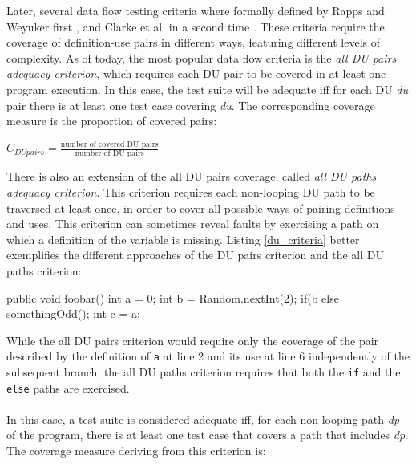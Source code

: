 Later, several data  flow testing criteria where formally defined by Rapps and Weyuker first \cite{Rapps}, and Clarke et al. in a second time \cite{Clarke}. These criteria require the coverage of definition-use pairs in different ways, featuring different levels of complexity.
As of today, the most popular data flow criteria is the \textit{all DU pairs adequacy criterion}, which 
requires each DU pair to be covered in at least one program execution. In this 
case, the test suite will be adequate iff for each DU \textit{du} pair there is at least one 
test case covering \textit{du}. The corresponding coverage measure is the 
proportion of covered pairs: 

\begin{center}
  $C_{DU pairs} = \frac{\text{number of covered DU pairs}}{\text{number of DU pairs}}$
\end{center}
%
There is also an extension of the all DU pairs coverage, called \textit{all DU paths adequacy 
criterion}. This criterion requires each non-looping DU path to be traversed at 
least once, in order to cover all possible ways of pairing definitions and uses. 
This criterion can sometimes reveal faults by exercising a path on which a 
definition of the variable is missing.  Listing \ref{du_criteria} better exemplifies the different approaches of the DU pairs criterion and the all DU paths criterion:

\begin{minipage}{0.5\textwidth}
\begin{jcode}[caption={Simple branching code}, label={du_criteria}]
public void foobar(){
  int a = 0;
  int b = Random.nextInt(2);
  if(b%
  else somethingOdd();
  int c = a;
}
\end{jcode} 
\end{minipage}
\begin{minipage}{0.5\textwidth}
While the all DU pairs criterion would require only the coverage of the pair 
described by the definition of \texttt{a} at line 2 and its use at line 6 independently of the subsequent 
branch, the all DU paths criterion requires that both the \texttt{if} and the \texttt{else} 
paths are exercised.
\end{minipage}

\paragraph{}
In this case, a test suite is considered adequate iff, for each non-looping 
path \textit{dp} of the program, there is at least one test case that covers a path that 
includes \textit{dp}. The coverage measure deriving from this criterion is:

